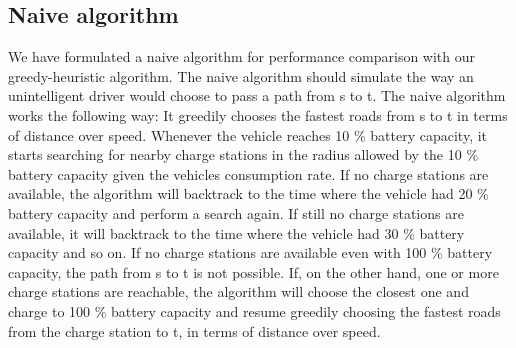 \subsection{Naive algorithm}
\label{sub:naivealgorithm}
We have formulated a naive algorithm for performance comparison with our greedy-heuristic algorithm. The naive algorithm should simulate the way an unintelligent driver would choose to pass a path from s to t. The naive algorithm works the following way: It greedily chooses the fastest roads from s to t in terms of distance over speed. Whenever the vehicle reaches 10 \% battery capacity, it starts searching for nearby charge stations in the radius allowed by the 10 \% battery capacity given the vehicles consumption rate. If no charge stations are available, the algorithm will backtrack to the time where the vehicle had 20 \% battery capacity and perform a search again. If still no charge stations are available, it will backtrack to the time where the vehicle had 30 \% battery capacity and so on. If no charge stations are available even with 100 \% battery capacity, the path from s to t is not possible. If, on the other hand, one or more charge stations are reachable, the algorithm will choose the closest one and charge to 100 \% battery capacity and resume greedily choosing the fastest roads from the charge station to t, in terms of distance over speed.




